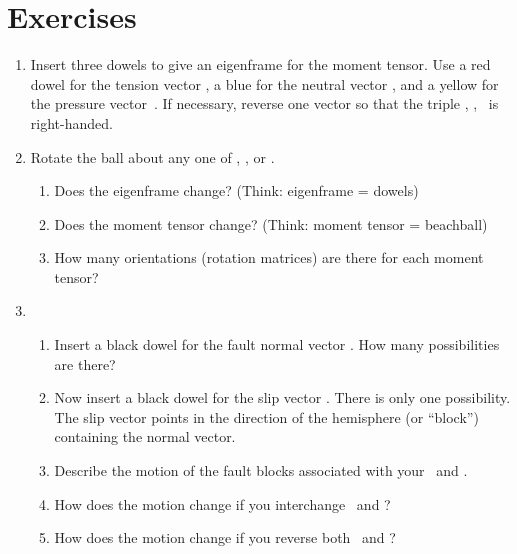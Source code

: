 \documentclass[11pt,titlepage,fleqn]{article}
\newcommand{\fvect}{\textcolor{red}{\mbT}}
\newcommand{\fvecb}{\textcolor{blue}{\mbB}}
\newcommand{\fvecp}{\textcolor{black}{\mbP}}
\newcommand{\fvecn}{\mbN}
\newcommand{\fvecs}{\mbS}
\begin{document}

\section*{Exercises}

\begin{enumerate}
\item Insert three dowels to give an eigenframe for the moment tensor. Use a red dowel for the tension vector \fvect, a blue for the neutral vector \fvecb, and a yellow for the pressure vector~\fvecp. If necessary, reverse one vector so that the triple \fvect, \fvecb, \fvecp\ is right-handed.


\item Rotate the ball  about any one of \fvect, \fvecb, or \fvecp.
%
\begin{enumerate}
\item Does the eigenframe change? (Think: eigenframe = dowels)

\item Does the moment tensor change? (Think: moment tensor = beachball)

\item How many orientations (rotation matrices) are there for each moment tensor?

\end{enumerate}


\item

\begin{enumerate}
\item Insert a black dowel for the fault normal vector \fvecn. How many possibilities are there?

\item Now insert a black dowel for the slip vector \fvecs. There is only one possibility. The slip vector points in the direction of the hemisphere (or ``block'') containing the normal vector.

\item Describe the motion of the fault blocks associated with your \fvecn\ and \fvecs.

\item How does the motion change if you interchange \fvecn\ and \fvecs?

\item How does the motion change if you reverse both \fvecn\ and \fvecs?


\end{enumerate}
\end{enumerate}
\end{document}
